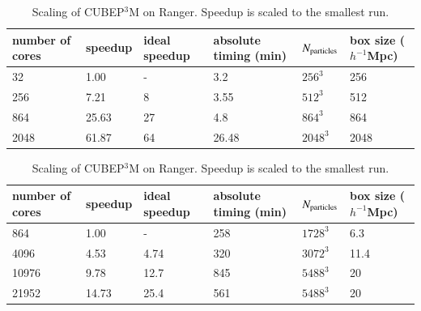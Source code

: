 \documentclass[useAMS,usenatbib]{mn2e}
\begin{document}
\begin{table}%
  \vskip -0.5cm 
  \begin{center}
\caption{Scaling of {\small CUBEP$^3$M} on Curie. Speedup is 
scaled to the smallest run.}
\label{summary_scaling_table}
\begin{tabular}{@{}|llllll|}
\hline
number of cores & speedup & ideal speedup & absolute timing (min) & 
$N_{\rm particles}$& box size ($h^{-1}$Mpc)
\\[2mm]\hline
32  &  1.00 & - &3.2 & $256^3$ & 256\\
256  & 7.21 & 8 &3.55 & $512^3$  & 512\\
864  & 25.63 & 27 &4.8 & $864^3$  & 864\\
2048  & 61.87 & 64 &26.48 & $2048^3$ & 2048 \\
\hline
\end{tabular}
\caption{Scaling of  {\small CUBEP$^3$M} on Ranger. Speedup is scaled to the smallest run.}
\label{summary_scaling_table2}
\begin{tabular}{@{}|llllll|}
\hline
number of cores & speedup & ideal speedup & absolute timing (min) & 
$N_{\rm particles}$& box size ($h^{-1}$Mpc)
\\[2mm]\hline
864    & 1.00  & -    &258   & $1728^3$  & 6.3\\
4096   & 4.53  & 4.74 &320   & $3072^3$  & 11.4\\
10976  & 9.78  & 12.7 &845   & $5488^3$  & 20\\
21952  & 14.73 & 25.4 &561   & $5488^3$  & 20 \\
\hline
\end{tabular}
\end{center}
  \vskip -0.7cm 
\end{table}

\end{document}
